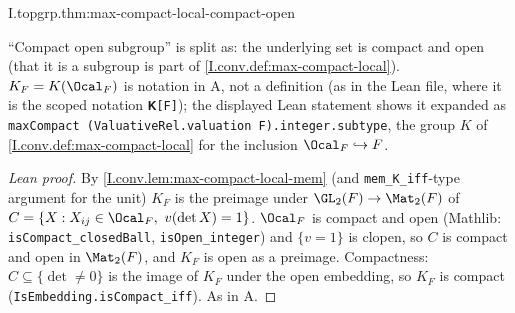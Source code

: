\begin{theorem}
\end{theorem}
\begin{tfformal}{I.topgrp.thm:max-compact-local-compact-open}
\begin{tffidelity}
``Compact open subgroup'' is split as: the underlying set is compact and open (that it is a subgroup is part of \cref{I.conv.def:max-compact-local}). $K_F=K(\Ocal_F)$ is notation in A, not a definition (as in the Lean file, where it is the scoped notation \texttt{𝐊[F]}); the displayed Lean statement shows it expanded as \texttt{maxCompact (ValuativeRel.valuation F).integer.subtype}, the group $K$ of \cref{I.conv.def:max-compact-local} for the inclusion $\Ocal_F\hookrightarrow F$.
\end{tffidelity}
\end{tfformal}
\begin{proof}[Lean proof]
By \cref{I.conv.lem:max-compact-local-mem} (and \texttt{mem\_K\_iff}-type argument for the unit) $K_F$ is the preimage under $\GL_2(F)\to\Mat_2(F)$ of $C=\{X: X_{ij}\in\Ocal_F,\ v(\det X)=1\}$. $\Ocal_F$ is compact and open (Mathlib: \texttt{isCompact\_closedBall}, \texttt{isOpen\_integer}) and $\{v=1\}$ is clopen, so $C$ is compact and open in $\Mat_2(F)$, and $K_F$ is open as a preimage. Compactness: $C\subseteq\{\det\neq0\}$ is the image of $K_F$ under the open embedding, so $K_F$ is compact (\texttt{IsEmbedding.isCompact\_iff}). As in A.
\end{proof}



